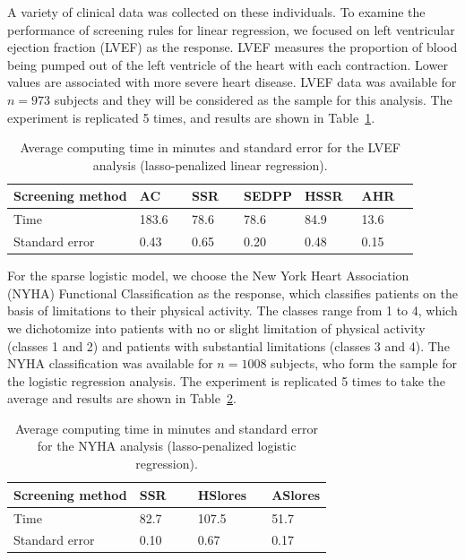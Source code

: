 \documentclass[]{interact}
\theoremstyle{plain}%
\theoremstyle{definition}
\theoremstyle{remark}
\begin{document}
A variety of clinical data was collected on these individuals. To examine the performance of screening rules for linear regression, we focused on left ventricular ejection fraction (LVEF) as the response. LVEF measures the proportion of blood being pumped out of the left ventricle of the heart with each contraction. Lower values are associated with more severe heart disease. LVEF data was available for $n=973$ subjects and they will be considered as the sample for this analysis. The experiment is replicated 5 times, and results are shown in Table~\ref{Tab:lvef}.

\begin{table}[H]
\centering
\begin{tabular}{llllll}
\toprule
Screening method & AC\,\,\,\,\,\,\,\,\,    & SSR\,\,\,\,\,\,   & SEDPP & HSSR\,\,\,  & AHR\,\,\,\,\,\,  \\
\midrule
Time & 183.6 & 78.6 & 78.6 & 84.9 & 13.6 \\
Standard error & 0.43 & 0.65 & 0.20 & 0.48 & 0.15 \\
\bottomrule
\end{tabular}
\caption{Average computing time in minutes and standard error for the LVEF analysis (lasso-penalized linear regression).\label{Tab:lvef}}
\end{table}

For the sparse logistic model, we choose the New York Heart Association (NYHA) Functional Classification as the response, which classifies patients on the basis of limitations to their physical activity. The classes range from 1 to 4, which we dichotomize into patients with no or slight limitation of physical activity (classes 1 and 2) and patients with substantial limitations (classes 3 and 4). The NYHA classification was available for $n=1008$ subjects, who form the sample for the logistic regression analysis. The experiment is replicated 5 times to take the average and results are shown in Table~\ref{Tab:nyha}.

\begin{table}[H]
\centering
\begin{tabular}{llll}
\toprule
Screening method & SSR\,\,\,\,\,\,\,\,\,    & HSlores\,\,\,\,\,\,   & ASlores \\
\midrule
Time & 82.7 & 107.5 & 51.7 \\
Standard error & 0.10 & 0.67 & 0.17 \\
\bottomrule
\end{tabular}
\caption{Average computing time in minutes and standard error for the NYHA analysis (lasso-penalized logistic regression).\label{Tab:nyha}}
\end{table}
\end{document}
